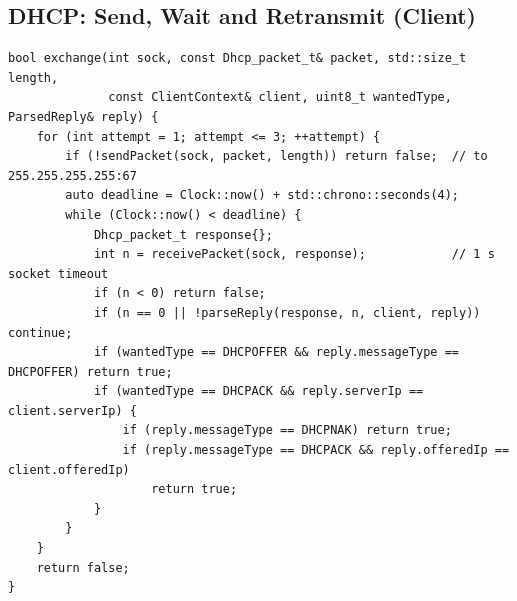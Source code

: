 \documentclass[11pt]{article}
\begin{document}
\subsection{DHCP: Send, Wait and Retransmit (Client)}
\begin{lstlisting}
bool exchange(int sock, const Dhcp_packet_t& packet, std::size_t length,
              const ClientContext& client, uint8_t wantedType, ParsedReply& reply) {
    for (int attempt = 1; attempt <= 3; ++attempt) {
        if (!sendPacket(sock, packet, length)) return false;  // to 255.255.255.255:67
        auto deadline = Clock::now() + std::chrono::seconds(4);
        while (Clock::now() < deadline) {
            Dhcp_packet_t response{};
            int n = receivePacket(sock, response);            // 1 s socket timeout
            if (n < 0) return false;
            if (n == 0 || !parseReply(response, n, client, reply)) continue;
            if (wantedType == DHCPOFFER && reply.messageType == DHCPOFFER) return true;
            if (wantedType == DHCPACK && reply.serverIp == client.serverIp) {
                if (reply.messageType == DHCPNAK) return true;
                if (reply.messageType == DHCPACK && reply.offeredIp == client.offeredIp)
                    return true;
            }
        }
    }
    return false;
}
\end{lstlisting}
\end{document}
